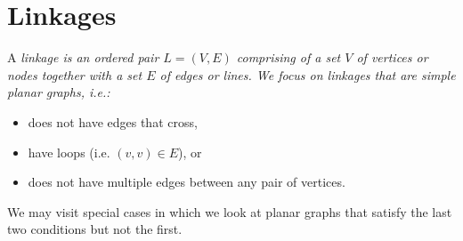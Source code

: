\section{Linkages}
A \it{linkage} is an ordered pair $L = (V,E)$ comprising of a set $V$ of vertices or nodes together with a set $E$ of edges or lines. %
We focus on linkages that are simple planar  graphs, i.e.:
\begin{itemize}
\item[\rn{1}] does not have edges that cross,
\item[\rn{2}] have loops (i.e. $(v,v) \in E$), or
\item[\rn{3}] does not have multiple edges between any pair of vertices.
\end{itemize}
We may visit special cases in which we look at planar graphs that satisfy the last two conditions but not the first.  
